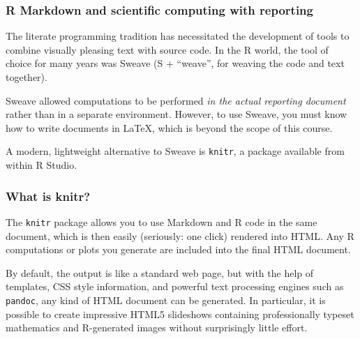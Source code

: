 \documentclass[11pt,ignorenonframetext,]{beamer}
\begin{document}
\begin{frame}\frametitle{R Markdown and scientific computing with
reporting}

The literate programming tradition has necessitated the development of
tools to combine visually pleasing text with source code. In the R
world, the tool of choice for many years was Sweave (S + ``weave'', for
weaving the code and text together).

Sweave allowed computations to be performed \emph{in the actual
reporting document} rather than in a separate environment. However, to
use Sweave, you must know how to write documents in LaTeX, which is
beyond the scope of this course.

A modern, lightweight alternative to Sweave is \texttt{knitr}, a package
available from within R Studio.

\end{frame}

\begin{frame}\frametitle{What is knitr?}

The \texttt{knitr} package allows you to use Markdown and R code in the
same document, which is then easily (seriously: one click) rendered into
HTML. Any R computations or plots you generate are included into the
final HTML document.

By default, the output is like a standard web page, but with the help of
templates, CSS style information, and powerful text processing engines
such as \texttt{pandoc}, any kind of HTML document can be generated. In
particular, it is possible to create impressive HTML5 slideshows
containing professionally typeset mathematics and R-generated images
without surprisingly little effort.

\end{frame}
\end{document}
